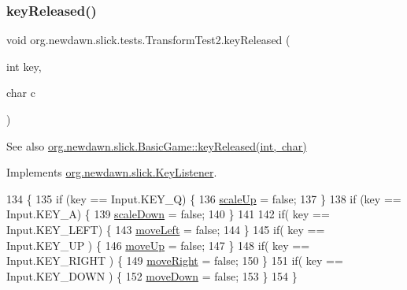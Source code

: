 \subsubsection{\texorpdfstring{key\+Released()}{keyReleased()}}
{\footnotesize\ttfamily void org.\+newdawn.\+slick.\+tests.\+Transform\+Test2.\+key\+Released (\begin{DoxyParamCaption}\item[{int}]{key,  }\item[{char}]{c }\end{DoxyParamCaption})\hspace{0.3cm}{\ttfamily [inline]}}

\begin{DoxySeeAlso}{See also}
\mbox{\hyperlink{classorg_1_1newdawn_1_1slick_1_1_basic_game_ae8ce436f93206f0b251a0fbf2a345849}{org.\+newdawn.\+slick.\+Basic\+Game\+::key\+Released(int, char)}} 
\end{DoxySeeAlso}


Implements \mbox{\hyperlink{interfaceorg_1_1newdawn_1_1slick_1_1_key_listener_a474673b59bc77266bcef3c261c26ee2b}{org.\+newdawn.\+slick.\+Key\+Listener}}.


\begin{DoxyCode}
134                                             \{
135       \textcolor{keywordflow}{if} (key == Input.KEY\_Q) \{
136          \mbox{\hyperlink{classorg_1_1newdawn_1_1slick_1_1tests_1_1_transform_test2_ad5d1f511abd23701eaa9473d3ba5dc39}{scaleUp}} = \textcolor{keyword}{false};
137       \}
138       \textcolor{keywordflow}{if} (key == Input.KEY\_A) \{
139          \mbox{\hyperlink{classorg_1_1newdawn_1_1slick_1_1tests_1_1_transform_test2_a048479d9f00dfba8682ccfdac4c18d6e}{scaleDown}} = \textcolor{keyword}{false};
140       \}
141       
142       \textcolor{keywordflow}{if}( key == Input.KEY\_LEFT) \{
143          \mbox{\hyperlink{classorg_1_1newdawn_1_1slick_1_1tests_1_1_transform_test2_ad68834f4b263bb997ccea930ecf0033a}{moveLeft}} = \textcolor{keyword}{false};
144       \}
145       \textcolor{keywordflow}{if}( key == Input.KEY\_UP ) \{
146          \mbox{\hyperlink{classorg_1_1newdawn_1_1slick_1_1tests_1_1_transform_test2_a64750778b32660b9c33420532d739ddb}{moveUp}} = \textcolor{keyword}{false};
147       \}
148       \textcolor{keywordflow}{if}( key == Input.KEY\_RIGHT ) \{
149          \mbox{\hyperlink{classorg_1_1newdawn_1_1slick_1_1tests_1_1_transform_test2_a5b9abdc8d57aed44b9718974c01e862d}{moveRight}} = \textcolor{keyword}{false};
150       \}
151       \textcolor{keywordflow}{if}( key == Input.KEY\_DOWN ) \{
152          \mbox{\hyperlink{classorg_1_1newdawn_1_1slick_1_1tests_1_1_transform_test2_a29d67f3d4d24ae44eecf33a69600e4ac}{moveDown}} = \textcolor{keyword}{false};
153       \}
154    \}
\end{DoxyCode}
\mbox{\label{classorg_1_1newdawn_1_1slick_1_1tests_1_1_transform_test2_a497495f408ce53e3456ec729d465d200}} 
